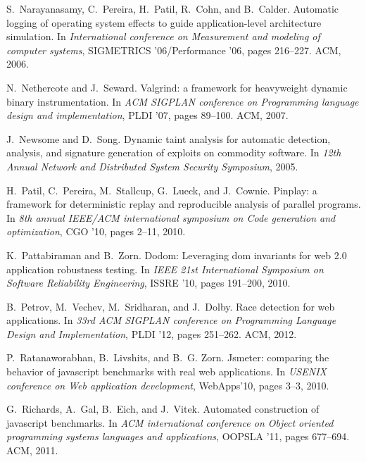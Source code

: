 \documentclass{sig-alternate}
\begin{document}
{\begin{thebibliography}{10}
S.~Narayanasamy, C.~Pereira, H.~Patil, R.~Cohn, and B.~Calder.
\newblock Automatic logging of operating system effects to guide
  application-level architecture simulation.
\newblock In {\em International conference on Measurement and modeling of
  computer systems}, SIGMETRICS '06/Performance '06, pages 216--227. ACM, 2006.

N.~Nethercote and J.~Seward.
\newblock Valgrind: a framework for heavyweight dynamic binary instrumentation.
\newblock In {\em ACM SIGPLAN conference on Programming language design and
  implementation}, PLDI '07, pages 89--100. ACM, 2007.

J.~Newsome and D.~Song.
\newblock Dynamic taint analysis for automatic detection, analysis, and
  signature generation of exploits on commodity software.
\newblock In {\em 12th Annual Network and Distributed System Security
  Symposium}, 2005.

H.~Patil, C.~Pereira, M.~Stallcup, G.~Lueck, and J.~Cownie.
\newblock Pinplay: a framework for deterministic replay and reproducible
  analysis of parallel programs.
\newblock In {\em 8th annual IEEE/ACM international symposium on Code
  generation and optimization}, CGO '10, pages 2--11, 2010.

K.~Pattabiraman and B.~Zorn.
\newblock Dodom: Leveraging dom invariants for web 2.0 application robustness
  testing.
\newblock In {\em IEEE 21st International Symposium on Software Reliability
  Engineering}, ISSRE '10, pages 191--200, 2010.

B.~Petrov, M.~Vechev, M.~Sridharan, and J.~Dolby.
\newblock Race detection for web applications.
\newblock In {\em 33rd ACM SIGPLAN conference on Programming Language Design
  and Implementation}, PLDI '12, pages 251--262. ACM, 2012.

P.~Ratanaworabhan, B.~Livshits, and B.~G. Zorn.
\newblock Jsmeter: comparing the behavior of javascript benchmarks with real
  web applications.
\newblock In {\em USENIX conference on Web application development},
  WebApps'10, pages 3--3, 2010.

G.~Richards, A.~Gal, B.~Eich, and J.~Vitek.
\newblock Automated construction of javascript benchmarks.
\newblock In {\em ACM international conference on Object oriented programming
  systems languages and applications}, OOPSLA '11, pages 677--694. ACM, 2011.


\end{thebibliography}}
\end{document}

